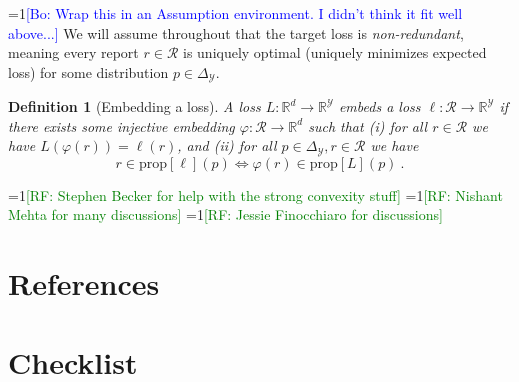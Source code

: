 \documentclass{article}
\newtheorem{definition}{Definition}
\newcommand{\Comments}{1}
\newcommand{\mynote}[2]{\ifnum\Comments=1\textcolor{#1}{#2}\fi}
\newcommand{\raf}[1]{\mynote{green}{[RF: #1]}}
\newcommand{\bo}[1]{\mynote{blue}{[Bo: #1]}}
\newcommand{\reals}{\mathbb{R}}
\newcommand{\prop}[1]{\mathrm{prop}[#1]}
\newcommand{\simplex}{\Delta_\Y}
\newcommand{\R}{\mathcal{R}}
\newcommand{\Y}{\mathcal{Y}}
\begin{document}
\bo{Wrap this in an Assumption environment. I didn't think it fit well above...} We will assume throughout that the target loss is \emph{non-redundant}, meaning every report $r \in \R$ is uniquely optimal (uniquely minimizes expected loss) for some distribution $p\in\simplex$.

\begin{definition}[Embedding a loss]\label{def:loss-embed}
  A loss $L:\reals^d\to\reals^\Y$ \emph{embeds} a loss $\ell:\R\to\reals^\Y$ if there exists some injective embedding $\varphi:\R\to\reals^d$ such that
  (i) for all $r\in\R$ we have $L(\varphi(r)) = \ell(r)$, and (ii) for all $p\in\simplex,r\in\R$ we have
  \begin{equation}\label{eq:embed-loss}
    r \in \prop{\ell}(p) \iff \varphi(r) \in \prop{L}(p)~.
  \end{equation}
\end{definition}









\begin{ack}
  \raf{Stephen Becker for help with the strong convexity stuff}
  \raf{Nishant Mehta for many discussions}
  \raf{Jessie Finocchiaro for discussions}
\end{ack}

\section*{References}




\section*{Checklist}
\end{document}
